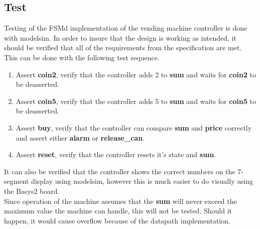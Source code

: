 \subsection{Test}
Testing of the FSMd implementation of the vending machine controller is done with modelsim.
In order to insure that the design is working as intended, it should be verified that
all of the requirements from the specification are met. 
This can be done with the following test sequence.
\begin{enumerate}
    \item Assert \textbf{coin2}, verify that the controller adds 2 to \textbf{sum} and waits for \textbf{coin2} to be deasserted.
    \item Assert \textbf{coin5}, verify that the controller adds 5 to \textbf{sum} and waits for \textbf{coin5} to be deasserted.
    \item Assert \textbf{buy}, verify that the controller can compare \textbf{sum} and \textbf{price} correctly and assert either \textbf{alarm} or \textbf{release\_can}.
    \item Assert \textbf{reset}, verify that the controller resets it's state and \textbf{sum}.
\end{enumerate}
It can also be verified that the controller shows the correct numbers on the 7-segment display using modelsim, however this is much easier to do 
visually using the Basys2 board. \\

Since operation of the machine assumes that the \textbf{sum} will never exceed the maximum value the machine can handle, this will not be tested.
Should it happen, it would cause overflow because of the datapath implementation.
